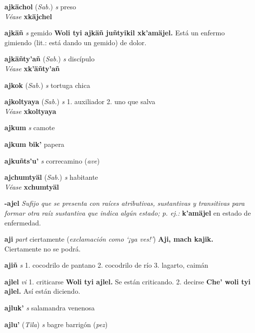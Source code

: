 \documentclass[10pt]{scrbook}
\newcommand{\entry}[1]{\textbf{#1}}
\newcommand{\onedefinition}[1]{#1.}
\newcommand{\nontranslationdef}[1]{\textit{#1}}
\newcommand{\partofspeech}[1]{\textit{#1}}
\newcommand{\spanishtranslation}[1]{#1}
\newcommand{\clarification}[1]{(\textit{#1})}
\newcommand{\cholexample}[1]{\textbf{#1}}
\newcommand{\exampletranslation}[1]{#1}
\newcommand{\alsosee}[1]{\\\textit{Véase} \textbf{#1}}
\newcommand{\relevantdialect}[1]{(\textit{#1})}
\begin{document}
\begin{multicols}{2}
\entry{ajkächol}
\relevantdialect{Sab.}
\partofspeech{s}
\spanishtranslation{preso}
\alsosee{xkäjchel}

\entry{ajkäñ}
\partofspeech{s}
\spanishtranslation{gemido}
\cholexample{Woli tyi ajkäñ juñtyikil xk'amäjel.}
\exampletranslation{Está un enfermo gimiendo (lit.: está dando un gemido) de dolor.}

\entry{ajkäñty'añ}
\relevantdialect{Sab.}
\partofspeech{s}
\spanishtranslation{discípulo}
\alsosee{xk'äñty'añ}

\entry{ajkok}
\relevantdialect{Sab.}
\partofspeech{s}
\spanishtranslation{tortuga chica}

\entry{ajkoltyaya}
\relevantdialect{Sab.}
\partofspeech{s}
\onedefinition{1}
\spanishtranslation{auxiliador}
\onedefinition{2}
\spanishtranslation{uno que salva}
\alsosee{xkoltyaya}

\entry{ajkum}
\partofspeech{s}
\spanishtranslation{camote}

\entry{ajkum bik'}
\spanishtranslation{papera}

\entry{ajkuñts'u'}
\partofspeech{s}
\spanishtranslation{correcamino}
\clarification{ave}

\entry{ajchumtyäl}
\relevantdialect{Sab.}
\partofspeech{s}
\spanishtranslation{habitante}
\alsosee{xchumtyäl}

\entry{-ajel}
\nontranslationdef{Sufijo que se presenta con raíces atributivas, sustantivas y transitivas para formar otra raíz sustantiva que indica algún estado; p. ej.:}
\cholexample{k'amäjel}
\exampletranslation{en estado de enfermedad.}

\entry{aji}
\partofspeech{part}
\spanishtranslation{ciertamente}
\clarification{exclamación como ‘¡ya ves!’}
\cholexample{Aji, mach kajik.}
\exampletranslation{Ciertamente no se podrá.}

\entry{ajiñ}
\partofspeech{s}
\onedefinition{1}
\spanishtranslation{cocodrilo de pantano}
\onedefinition{2}
\spanishtranslation{cocodrilo de río}
\onedefinition{3}
\spanishtranslation{lagarto, caimán}

\entry{ajlel}
\partofspeech{vi}
\onedefinition{1}
\spanishtranslation{criticarse}
\cholexample{Woli tyi ajlel.}
\exampletranslation{Se están criticando.}
\onedefinition{2}
\spanishtranslation{decirse}
\cholexample{Che' woli tyi ajlel.}
\exampletranslation{Así están diciendo.}

\entry{ajluk'}
\partofspeech{s}
\spanishtranslation{salamandra venenosa}

\entry{ajlu'}
\relevantdialect{Tila}
\partofspeech{s}
\spanishtranslation{bagre barrigón}
\clarification{pez}


\end{multicols}
\end{document}
